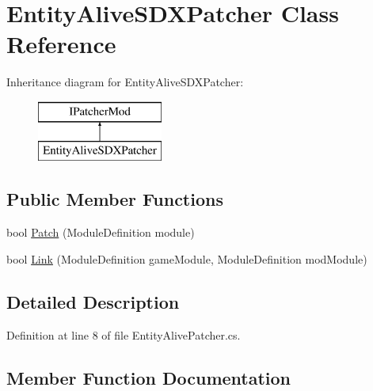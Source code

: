\hypertarget{class_entity_alive_s_d_x_patcher}{}\section{Entity\+Alive\+S\+D\+X\+Patcher Class Reference}
\label{class_entity_alive_s_d_x_patcher}
Inheritance diagram for Entity\+Alive\+S\+D\+X\+Patcher\+:\begin{figure}[H]
\begin{center}
\leavevmode
\includegraphics[height=2.000000cm]{class_entity_alive_s_d_x_patcher}
\end{center}
\end{figure}
\subsection*{Public Member Functions}
\begin{DoxyCompactItemize}
\item 
bool \mbox{\hyperlink{class_entity_alive_s_d_x_patcher_ad788ad16448a2a09ac7e0f4cd7c6030e}{Patch}} (Module\+Definition module)
\item 
bool \mbox{\hyperlink{class_entity_alive_s_d_x_patcher_a07ae5aad8d3a741523d269514d1586cc}{Link}} (Module\+Definition game\+Module, Module\+Definition mod\+Module)
\end{DoxyCompactItemize}


\subsection{Detailed Description}


Definition at line 8 of file Entity\+Alive\+Patcher.\+cs.



\subsection{Member Function Documentation}
\mbox{\label{class_entity_alive_s_d_x_patcher_a07ae5aad8d3a741523d269514d1586cc}} 
